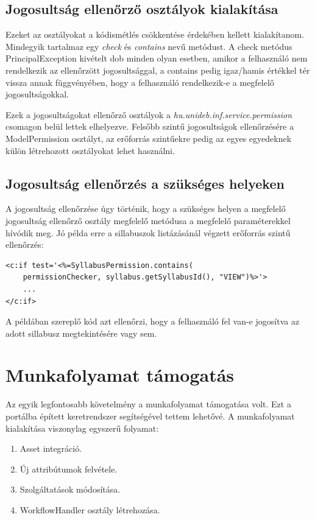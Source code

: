 \documentclass[hidelinks, 12pt, a4paper]{report}
\begin{document}
\subsection{Jogosultság ellenőrző osztályok kialakítása}

Ezeket az osztályokat a kódismétlés csökkentése érdekében kellett kialakítanom. Mindegyik tartalmaz egy \emph{check} és \emph{contains} nevű metódust. A check metódus PrincipalException kivételt dob minden olyan esetben, amikor a felhasználó nem rendelkezik az ellenőrzött jogosultsággal, a contains pedig igaz/hamis értékkel tér vissza annak függvényében, hogy a felhasználó rendelkezik-e a megfelelő jogosultságokkal.

Ezek a jogosultságokat ellenőrző osztályok a \emph{hu.unideb.inf.service.permission} csomagon belül lettek elhelyezve. Felsőbb szintű jogosultságok ellenőrzésére a ModelPermission osztályt, az erőforrás szintűekre pedig az egyes egyedeknek külön létrehozott osztályokat lehet használni.

\subsection{Jogosultság ellenőrzés a szükséges helyeken}

A jogosultság ellenőrzése úgy történik, hogy a szükséges helyen a megfelelő jogosultság ellenőrző osztály megfelelő metódusa a megfelelő paraméterekkel hívódik meg. Jó példa erre a sillabuszok listázásánál végzett erőforrás szintű ellenőrzés:

\begin{minipage}{\linewidth}
\begin{lstlisting}[basicstyle=\small]
<c:if test='<%=SyllabusPermission.contains(
	permissionChecker, syllabus.getSyllabusId(), "VIEW")%>'>
	...
</c:if>
\end{lstlisting}
\end{minipage}

\noindent A példában szereplő kód azt ellenőrzi, hogy a felhasználó fel van-e jogosítva az adott sillabusz megtekintésére vagy sem.

\section{Munkafolyamat támogatás}

Az egyik legfontosabb követelmény a munkafolyamat támogatása volt. Ezt a portálba épített keretrendszer segítségével tettem lehetővé. A munkafolyamat kialakítása viszonylag egyszerű folyamat:
\begin{enumerate}
\item Asset integráció.
\item Új attribútumok felvétele.
\item Szolgáltatások módosítása.
\item WorkflowHandler osztály létrehozása.
\end{enumerate}
\end{document}
